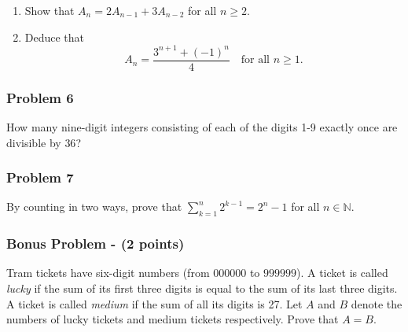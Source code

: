 \newpage\documentclass[11pt,onecolumn,fleqn]{article}
\theoremstyle{definition}
\begin{document}
\begin{enumerate}

\item Show that $A_n = 2A_{n-1} + 3A_{n-2}$ for all $n\geq 2$.

\item Deduce that $$A_n = \dfrac{3^{n+1} + (-1)^n}4\quad\text{for all }n\geq 1.$$

\end{enumerate}


\subsubsection*{Problem 6}
How many nine-digit integers consisting of each of the digits 1-9 exactly once are divisible by $36$?


\subsubsection*{Problem 7}
By counting in two ways, prove that $\sum_{k=1}^n 2^{k-1} = 2^n - 1$ for all $n \in \mathbb{N}$.


\subsubsection*{Bonus Problem - (2 points)} Tram tickets have six-digit numbers (from $000000$ to $999999$). A ticket 
is called \textit{lucky} if the sum of its first three digits is equal to the sum of its last three digits. 
A ticket is called \textit{medium} if the sum of all its digits is 27. Let $A$ and $B$ denote the numbers of lucky 
tickets and medium tickets respectively. Prove that $A=B$. 
\end{document}
